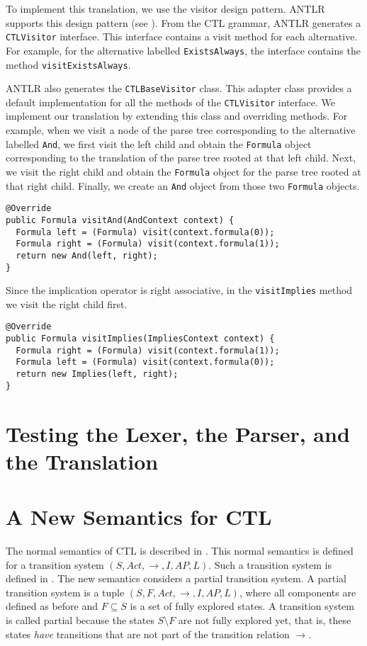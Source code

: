 \documentclass[12pt]{article}
\theoremstyle{definition}
\begin{document}
To implement this translation, we use the visitor design pattern.  ANTLR supports this design pattern (see \cite[Section~7.3]{P13}).  From the CTL grammar, ANTLR generates a \lstinline{CTLVisitor} interface.  This interface contains a visit method for each alternative.  For example, for the alternative labelled \lstinline{ExistsAlways}, the interface contains the method \lstinline{visitExistsAlways}.

ANTLR also generates the \lstinline{CTLBaseVisitor} class.  This adapter class provides a default implementation for all the methods of the \lstinline{CTLVisitor} interface.  We implement our translation by extending this class and overriding methods.  For example, when we visit a node of the parse tree corresponding to the alternative labelled \lstinline{And}, we first visit the left child and obtain the \lstinline{Formula} object corresponding to the translation of the parse tree rooted at that left child.  Next, we visit the right child and obtain the \lstinline{Formula} object for the parse tree rooted at that right child.  Finally, we create an \lstinline{And} object from those two \lstinline{Formula} objects.

\begin{lstlisting}
@Override
public Formula visitAnd(AndContext context) {
  Formula left = (Formula) visit(context.formula(0));
  Formula right = (Formula) visit(context.formula(1));
  return new And(left, right);
}
\end{lstlisting}

Since the implication operator is right associative, in the \lstinline{visitImplies} method we visit the right child first.
\begin{lstlisting}
@Override
public Formula visitImplies(ImpliesContext context) {
  Formula right = (Formula) visit(context.formula(1));
  Formula left = (Formula) visit(context.formula(0));
  return new Implies(left, right);
}
\end{lstlisting}

\section{Testing the Lexer, the Parser, and the Translation}




\section{A New Semantics for CTL}

The normal semantics of CTL is described in \cite[Section~6.2.2]{BK08}.  This normal semantics is defined for a transition system $(S, Act, \rightarrow, I, AP, L)$.  Such a transition system is defined in \cite[Definition~2.1]{BK08}.  The new semantics considers a partial transition system.  A partial transition system is a tuple $(S, F, Act, \rightarrow, I, AP, L)$, where all components are defined as before and $F \subseteq S$ is a set of fully explored states.  A transition system is called partial because the states $S \setminus F$ are not fully explored yet, that is, these states \emph{have} transitions that are not part of the transition relation $\rightarrow$.  
\end{document}
